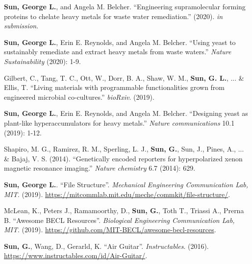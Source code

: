 

\begin{cvparagraph}
\textbf{Sun, George L.}, and Angela M. Belcher. ``Engineering supramolecular forming proteins to chelate heavy metals for waste water remediation.'' (2020). \textit{in submission}.

\textbf{Sun, George L.}, Erin E. Reynolds, and Angela M. Belcher. ``Using yeast to sustainably remediate and extract heavy metals from waste waters.'' \textit{Nature Sustainability} (2020): 1-9.

Gilbert, C., Tang, T. C., Ott, W., Dorr, B. A., Shaw, W. M., \textbf{Sun, G. L.}, ... \& Ellis, T. ``Living materials with programmable functionalities grown from engineered microbial co-cultures.'' \textit{bioRxiv}. (2019).

\textbf{Sun, George L.}, Erin E. Reynolds, and Angela M. Belcher. ``Designing yeast as plant-like hyperaccumulators for heavy metals.'' \textit{Nature communications} 10.1 (2019): 1-12.

Shapiro, M. G., Ramirez, R. M., Sperling, L. J., \textbf{Sun, G.}, Sun, J., Pines, A., ... \& Bajaj, V. S. (2014). ``Genetically encoded reporters for hyperpolarized xenon magnetic resonance imaging.'' \textit{Nature chemistry} 6.7 (2014): 629.

\end{cvparagraph}


\begin{cvparagraph}
\textbf{Sun, George L.}. ``File Structure''. \textit{Mechanical Engineering Communication Lab, MIT}. (2019). \newline
\url{https://mitcommlab.mit.edu/meche/commkit/file-structure/}.

McLean, K., Peters J., Ramamoorthy, D., \textbf{Sun, G.}, Toth T., Triassi A., Prerna B. ``Awesome BECL Resources''. \textit{Biological Engineering Communication Lab, MIT}. (2019). \url{https://github.com/MIT-BECL/awesome-becl-resources}.

\textbf{Sun, G.}, Wang, D., Gerarld, K. ``Air Guitar''. \textit{Instructables}. (2016). \newline
\url{https://www.instructables.com/id/Air-Guitar/}.

\end{cvparagraph}
